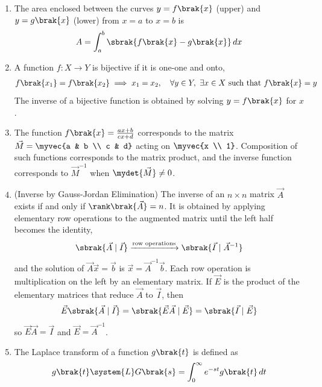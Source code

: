 \begin{enumerate}[label=\thesubsection.\arabic*, ref=\thesubsection.\theenumi]
with $g\brak{\vec{h}} = \vec{h}^{\top}\vec{V}\vec{h} + 2\vec{u}^{\top}\vec{h} + f$.
\item The area enclosed between the curves $y = f\brak{x}$ (upper) and $y = g\brak{x}$ (lower) from $x = a$ to $x = b$ is
\begin{align}
	A = \int_{a}^{b}\sbrak{f\brak{x} - g\brak{x}}\, dx
	\label{eq:EE26BTECH11229-area-curves}
\end{align}
\item A function $f: X \to Y$ is bijective if it is one-one and onto,
\begin{align}
	f\brak{x_1} = f\brak{x_2} \implies x_1 = x_2, \quad \forall y \in Y, \ \exists x \in X \text{ such that } f\brak{x} = y
	\label{eq:EE26BTECH11229-bij}
\end{align}
The inverse of a bijective function is obtained by solving $y = f\brak{x}$ for $x$.
\item The function $f\brak{x} = \frac{ax + b}{cx + d}$ corresponds to the matrix $\vec{M} = \myvec{a & b \\ c & d}$ acting on $\myvec{x \\ 1}$. Composition of such functions corresponds to the matrix product, and the inverse function corresponds to $\vec{M}^{-1}$ when $\mydet{\vec{M}} \neq 0$.
\label{eq:EE26BTECH11229-mobius}
\item (Inverse by Gauss-Jordan Elimination) The inverse of an $n \times n$ matrix $\vec{A}$ exists if and only if $\rank\brak{\vec{A}} = n$. It is obtained by applying elementary row operations to the augmented matrix until the left half becomes the identity,
\begin{align}
	\sbrak{\vec{A} \mid \vec{I}} \xrightarrow{\text{row operations}} \sbrak{\vec{I} \mid \vec{A}^{-1}}
	\label{eq:EE26BTECH11229-gauss-inverse}
\end{align}
and the solution of $\vec{A}\vec{x} = \vec{b}$ is $\vec{x} = \vec{A}^{-1}\vec{b}$.
\solution
Each row operation is multiplication on the left by an elementary matrix. If $\vec{E}$ is the product of the elementary matrices that reduce $\vec{A}$ to $\vec{I}$, then
\begin{align}
	\vec{E}\sbrak{\vec{A} \mid \vec{I}} = \sbrak{\vec{E}\vec{A} \mid \vec{E}} = \sbrak{\vec{I} \mid \vec{E}}
\end{align}
so $\vec{E}\vec{A} = \vec{I}$ and $\vec{E} = \vec{A}^{-1}$.
\item The Laplace transform of a function $g\brak{t}$ is defined as
\begin{align}
	g\brak{t} \system{L} G\brak{s} = \int_{0}^{\infty}e^{-st}g\brak{t}\, dt

\end{align}
\end{enumerate}

